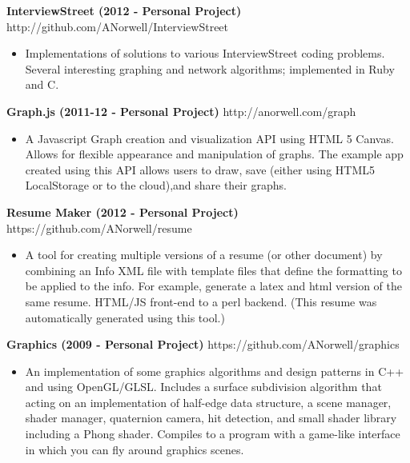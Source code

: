 \documentclass[line,margin]{res}
\begin{document}
\begin{resume}
{\bf InterviewStreet (2012 - Personal Project)} \hfill http://github.com/ANorwell/InterviewStreet
                 \begin{itemize}  \itemsep -2pt %
                 \item Implementations of solutions to various InterviewStreet coding problems. Several interesting graphing and network algorithms; implemented in Ruby and C. 
                \end{itemize}
  
{\bf Graph.js (2011-12 - Personal Project)} \hfill http://anorwell.com/graph
                 \begin{itemize}  \itemsep -2pt %
                 \item A Javascript Graph creation and visualization API using HTML 5 Canvas. Allows for flexible appearance and manipulation of graphs.  The example app created using this API allows users to draw, save (either using HTML5 LocalStorage or to the cloud),and share their graphs. 
                \end{itemize}
  
{\bf Resume Maker (2012 - Personal Project)} \hfill https://github.com/ANorwell/resume
                 \begin{itemize}  \itemsep -2pt %
                 \item A tool for creating multiple versions of a resume (or other document) by combining an Info XML file with template files that define the formatting to be applied to the info. For example, generate a latex and html version of the same resume. HTML/JS front-end to a perl backend. (This resume was automatically generated using this tool.)
                \end{itemize}
  
{\bf Graphics (2009 - Personal Project)} \hfill https://github.com/ANorwell/graphics
                 \begin{itemize}  \itemsep -2pt %
                 \item An implementation of some graphics algorithms and design patterns in C++ and using OpenGL/GLSL. Includes a surface subdivision algorithm that acting on an implementation of half-edge data structure, a scene manager, shader manager, quaternion camera, hit detection, and small shader library including a Phong shader. Compiles to a program with a game-like interface in which you can fly around graphics scenes.
                \end{itemize}
  



\end{resume}
\end{document}
